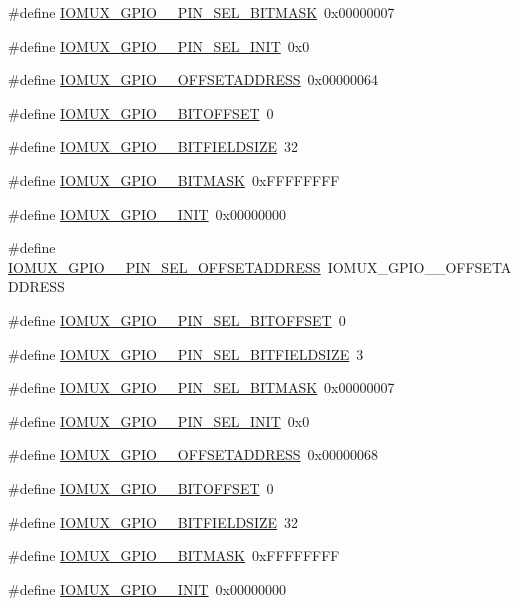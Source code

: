 \begin{DoxyCompactItemize}
\item 
\#define \hyperlink{a00560_a9371f3d8d2128a91192c9c30d35bfd10}{IOMUX\_\-GPIO\_\_\-PIN\_\-SEL\_\-BITMASK}~0x00000007
\item 
\#define \hyperlink{a00560_a97b2dc7d51b25032d1829fbb3e21447e}{IOMUX\_\-GPIO\_\_\-PIN\_\-SEL\_\-INIT}~0x0
\item 
\#define \hyperlink{a00560_a06fa4c24ba8e6f00b21c918fa05208b0}{IOMUX\_\-GPIO\_\_\-OFFSETADDRESS}~0x00000064
\item 
\#define \hyperlink{a00560_a33dd9bec274d0b38d54db5e07b9922a9}{IOMUX\_\-GPIO\_\_\-BITOFFSET}~0
\item 
\#define \hyperlink{a00560_ac543365184fb8f87f576293a49539599}{IOMUX\_\-GPIO\_\_\-BITFIELDSIZE}~32
\item 
\#define \hyperlink{a00560_a757249cba1cf95642ded4a7718a0e6ae}{IOMUX\_\-GPIO\_\_\-BITMASK}~0xFFFFFFFF
\item 
\#define \hyperlink{a00560_aa0498dfb9cd583b97989f52cadb55e93}{IOMUX\_\-GPIO\_\_\-INIT}~0x00000000
\item 
\#define \hyperlink{a00560_a6133a527e855107830c248cac4f86f1d}{IOMUX\_\-GPIO\_\_\-PIN\_\-SEL\_\-OFFSETADDRESS}~IOMUX\_\-GPIO\_\_\-OFFSETADDRESS
\item 
\#define \hyperlink{a00560_a010fb0d0a140c2b45ca4a76e37eb191c}{IOMUX\_\-GPIO\_\_\-PIN\_\-SEL\_\-BITOFFSET}~0
\item 
\#define \hyperlink{a00560_aa7f0e07eb067d52251a84277db2ae6d8}{IOMUX\_\-GPIO\_\_\-PIN\_\-SEL\_\-BITFIELDSIZE}~3
\item 
\#define \hyperlink{a00560_a5994c51002cbf911fa9ebd492d002df1}{IOMUX\_\-GPIO\_\_\-PIN\_\-SEL\_\-BITMASK}~0x00000007
\item 
\#define \hyperlink{a00560_ab94bc9752938d38d61ee02ce60fde66a}{IOMUX\_\-GPIO\_\_\-PIN\_\-SEL\_\-INIT}~0x0
\item 
\#define \hyperlink{a00560_a7972f5a1d32759fe4a40e8dcdb9448db}{IOMUX\_\-GPIO\_\_\-OFFSETADDRESS}~0x00000068
\item 
\#define \hyperlink{a00560_adf33434f5d7888537764c4f56357e6bf}{IOMUX\_\-GPIO\_\_\-BITOFFSET}~0
\item 
\#define \hyperlink{a00560_adf738d2aff5da2084a55ebcccf033111}{IOMUX\_\-GPIO\_\_\-BITFIELDSIZE}~32
\item 
\#define \hyperlink{a00560_a610e55208767af29030f039ddb4e0d45}{IOMUX\_\-GPIO\_\_\-BITMASK}~0xFFFFFFFF
\item 
\#define \hyperlink{a00560_aa395488528dce94850031be0f8582829}{IOMUX\_\-GPIO\_\_\-INIT}~0x00000000

\end{DoxyCompactItemize}
